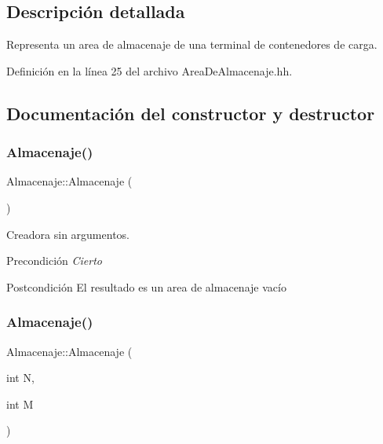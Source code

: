 \subsection{Descripción detallada}
Representa un area de almacenaje de una terminal de contenedores de carga. 

Definición en la línea 25 del archivo Area\+De\+Almacenaje.\+hh.



\subsection{Documentación del constructor y destructor}
\mbox{\label{class_almacenaje_aac76140a19e358858ec775cae4d23037}} 
\subsubsection{\texorpdfstring{Almacenaje()}{Almacenaje()}\hspace{0.1cm}{\footnotesize\ttfamily [1/3]}}
{\footnotesize\ttfamily Almacenaje\+::\+Almacenaje (\begin{DoxyParamCaption}{ }\end{DoxyParamCaption})}



Creadora sin argumentos. 

\begin{DoxyPrecond}{Precondición}
{\itshape Cierto} 
\end{DoxyPrecond}
\begin{DoxyPostcond}{Postcondición}
El resultado es un area de almacenaje vacío 
\end{DoxyPostcond}
\mbox{\label{class_almacenaje_a647530e3470da788413fe0288eeca339}} 
\subsubsection{\texorpdfstring{Almacenaje()}{Almacenaje()}\hspace{0.1cm}{\footnotesize\ttfamily [2/3]}}
{\footnotesize\ttfamily Almacenaje\+::\+Almacenaje (\begin{DoxyParamCaption}\item[{int}]{N,  }\item[{int}]{M }\end{DoxyParamCaption})}



